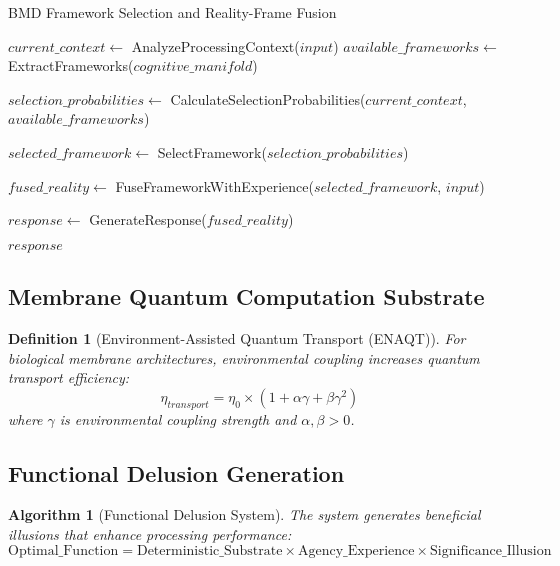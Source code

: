 \documentclass[12pt,a4paper]{article}
\newtheorem{definition}[theorem]{Definition}
\newtheorem{algorithm_def}[theorem]{Algorithm}
\begin{document}
\begin{algorithm}
\caption{BMD Framework Selection and Reality-Frame Fusion}
\begin{algorithmic}[1]
    \STATE $current\_context \leftarrow$ AnalyzeProcessingContext($input$)
    \STATE $available\_frameworks \leftarrow$ ExtractFrameworks($cognitive\_manifold$)
    
    \STATE $selection\_probabilities \leftarrow$ CalculateSelectionProbabilities($current\_context$, $available\_frameworks$)
    
    \STATE $selected\_framework \leftarrow$ SelectFramework($selection\_probabilities$)
    
    \STATE $fused\_reality \leftarrow$ FuseFrameworkWithExperience($selected\_framework$, $input$)
    
    \STATE $response \leftarrow$ GenerateResponse($fused\_reality$)
    
    \RETURN $response$
\ENDPROCEDURE
\end{algorithmic}
\end{algorithm}

\subsection{Membrane Quantum Computation Substrate}

\begin{definition}[Environment-Assisted Quantum Transport (ENAQT)]
For biological membrane architectures, environmental coupling increases quantum transport efficiency:
\begin{equation}
\eta_{transport} = \eta_0 \times (1 + \alpha \gamma + \beta \gamma^2)
\end{equation}
where $\gamma$ is environmental coupling strength and $\alpha, \beta > 0$.
\end{definition}

\subsection{Functional Delusion Generation}

\begin{algorithm_def}[Functional Delusion System]
The system generates beneficial illusions that enhance processing performance:
\begin{equation}
\text{Optimal\_Function} = \text{Deterministic\_Substrate} \times \text{Agency\_Experience} \times \text{Significance\_Illusion}
\end{equation}
\end{algorithm_def}
\end{document}
